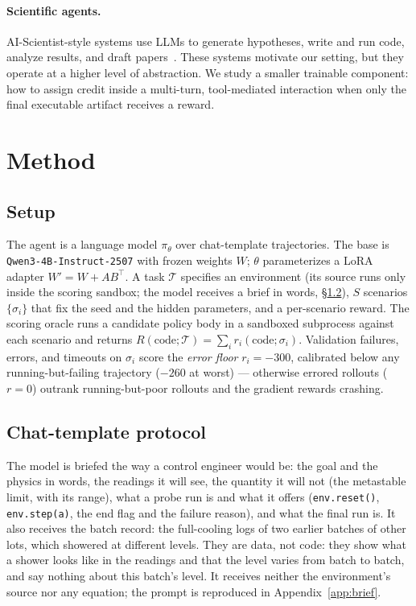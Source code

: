 \documentclass[11pt,a4paper]{article}
\begin{document}
\paragraph{Scientific agents.}
AI-Scientist-style systems use LLMs to generate hypotheses, write and run code, analyze results, and draft papers~\cite{lu2024aiscientist}. These systems motivate our setting, but they operate at a higher level of abstraction. We study a smaller trainable component: how to assign credit inside a multi-turn, tool-mediated interaction when only the final executable artifact receives a reward.

\section{Method}

\subsection{Setup}
\label{sec:setup}

The agent is a language model $\pi_\theta$ over chat-template
trajectories. The base is \texttt{Qwen3-4B-Instruct-2507} with
frozen weights $W$; $\theta$ parameterizes a LoRA adapter
$W' = W + AB^\top$. A task $\mathcal{T}$ specifies an environment (its
source runs only inside the scoring sandbox; the model receives a brief
in words, \S\ref{sec:protocol}), $S$ scenarios $\{\sigma_i\}$ that fix
the seed and the hidden parameters, and a per-scenario reward. The
scoring oracle runs a candidate policy body in a sandboxed subprocess
against each scenario and returns
\(
  R(\text{code};\mathcal{T}) = \sum_i r_i(\text{code};\sigma_i).
\)
Validation failures, errors, and timeouts on $\sigma_i$ score the
\emph{error floor} $r_i = -300$, calibrated below any
running-but-failing trajectory ($-260$ at worst) --- otherwise errored
rollouts ($r=0$) outrank running-but-poor rollouts and the gradient
rewards crashing.

\subsection{Chat-template protocol}
\label{sec:protocol}

The model is briefed the way a control engineer would be: the goal and
the physics in words, the readings it will see, the quantity it will not
(the metastable limit, with its range), what a probe run is and what it
offers (\texttt{env.reset()}, \texttt{env.step(a)}, the end flag and the
failure reason), and what the final run is. It also receives the batch
record: the full-cooling logs of two earlier batches of other lots, which
showered at different levels. They are data, not code: they show what a
shower looks like in the readings and that the level varies from batch to
batch, and say nothing about this batch's level. It receives neither the
environment's source nor any equation; the prompt is reproduced in
Appendix~\ref{app:brief}.
\end{document}
